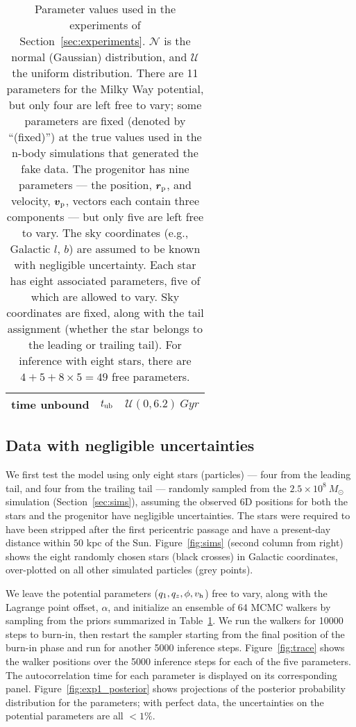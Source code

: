 \documentclass[letterpaper,12pt,preprint]{aastex}
\newcommand{\bs}{\boldsymbol}
\newcommand{\tub}{t_{\rm ub}}
\newcommand{\tint}{t_{\rm int}}
\newcommand{\Loffset}{\alpha}
\newcommand{\vhalo}{v_{\rm h}}
\begin{document}
\begin{table}[h]
\begin{center}
\begin{tabular}{l c l}
		time unbound & $\tub$ & $\mathcal{U}(0,6.2)~Gyr$\\ %
		\bottomrule
		\end{tabular}
	\caption{Parameter values used in the experiments of Section~\ref{sec:experiments}. $\mathcal{N}$ is the normal (Gaussian) distribution, and $\mathcal{U}$ the uniform distribution. There are 11 parameters for the Milky Way potential, but only four are left free to vary; some parameters are fixed (denoted by ``(fixed)'') at the true values used in the n-body simulations that generated the fake data. The progenitor has nine parameters --- the position, $\bs{r}_{\rm p}$, and velocity, $\bs{v}_{\rm p}$, vectors each contain three components --- but only five are left free to vary. The sky coordinates (e.g., Galactic $l$, $b$) are assumed to be known with negligible uncertainty. Each star has eight associated parameters, five of which are allowed to vary. Sky coordinates are fixed, along with the tail assignment (whether the star belongs to the leading or trailing tail). For inference with eight stars, there are $4+5+8\times5=49$ free parameters. \label{tbl:params}}
\end{center}
\end{table}

\subsection{Data with negligible uncertainties}\label{sec:exp1}

We first test the model using only eight stars (particles) --- four from the leading tail, and four from the trailing tail --- randomly sampled from the $2.5\times10^8~M_\odot$ simulation (Section~\ref{sec:sims}), assuming the observed 6D positions for both the stars and the progenitor have negligible uncertainties. The stars were required to have been stripped after the first pericentric passage and have a present-day distance within $50$ kpc of the Sun. Figure~\ref{fig:sims} (second column from right) shows the eight randomly chosen stars (black crosses) in Galactic coordinates, over-plotted on all other simulated particles (grey points). 

We leave the potential parameters ($q_1,q_z,\phi,\vhalo$) free to vary, along with the Lagrange point offset, $\Loffset$, and initialize an ensemble of 64 MCMC walkers by sampling from the priors summarized in Table~\ref{tbl:params}. We run the walkers for 10000 steps to burn-in, then restart the sampler starting from the final position of the burn-in phase and run for another 5000 inference steps. Figure~\ref{fig:trace} shows the walker positions over the 5000 inference steps for each of the five parameters. The autocorrelation time for each parameter is displayed on its corresponding panel. Figure~\ref{fig:exp1_posterior} shows projections of the posterior probability distribution for the parameters; with perfect data, the uncertainties on the potential parameters are all $<1\%$.
\end{document}
